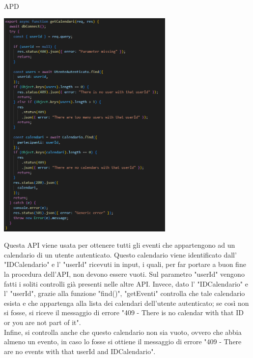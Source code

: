 \begin{listaPersonale} {APD}
\begin{listaPersonale2}[APD]{}
\begin{center}
                    \includegraphics[width=0.65\textwidth, height=0.55\textheight]{img/png/APIs/getCalendari.png}
                \end{center}
                \newpage
                Questa API viene usata per ottenere tutti gli eventi che appartengono ad un calendario di un utente autenticato. Questo calendario viene identificato dall'  "IDCalendario" e l' "userId" ricevuti in input, i quali, per far portare a buon fine la procedura dell'API, non devono essere vuoti. Sul parametro "userId" vengono fatti i soliti controlli già presenti nelle altre API. Invece, dato l' "IDCalendario" e l' "userId", grazie alla funzione "find()", "getEventi" controlla che tale calendario esista e che appartenga alla lista dei calendari dell'utente autenticato; se così non si fosse, si riceve il messaggio di errore "409 - There is no calendar with that ID or you are not part of it". \\
                Infine, si controlla anche che questo calendario non sia vuoto, ovvero che abbia almeno un evento, in caso lo fosse si ottiene il messaggio di errore "409 - There are no events with that userId and IDCalendario".
                \begin{center}

\end{center}
\end{listaPersonale2}
\end{listaPersonale}
